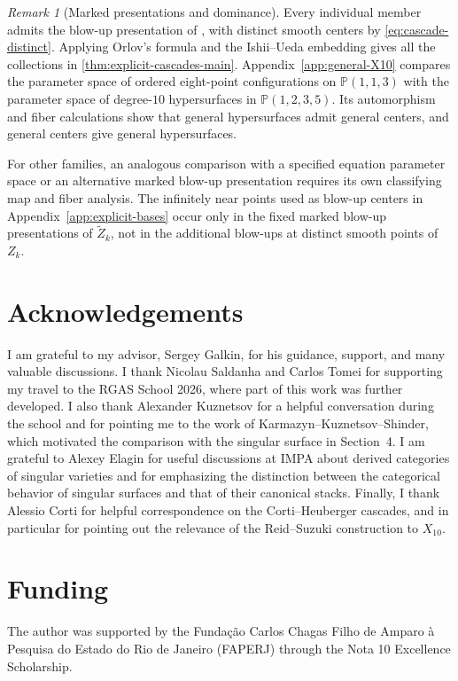 \documentclass[11pt]{article}
\theoremstyle{plain}
\theoremstyle{definition}
\theoremstyle{remark}
\newtheorem{remark}[remark]{Remark}
\newcommand{\Pp}{\mathbb P}
\begin{document}
\begin{remark}[Marked presentations and dominance]
\label{rem:presentations-versus-dominance}
Every individual member admits the blow-up presentation of
\cite[Corollary~8(1)--(6)]{Corti2016}, with distinct smooth centers by
\eqref{eq:cascade-distinct}. Applying Orlov's formula and the Ishii--Ueda
embedding gives all the collections in \cref{thm:explicit-cascades-main}.
Appendix~\ref{app:general-X10} compares the parameter space of ordered
eight-point configurations on \(\Pp(1,1,3)\) with the parameter space of
degree-\(10\) hypersurfaces in \(\Pp(1,2,3,5)\). Its automorphism and
fiber calculations show that general hypersurfaces admit general centers,
and general centers give general hypersurfaces.

For other families, an analogous comparison with a specified equation
parameter space or an alternative marked blow-up presentation requires its own
classifying map and fiber analysis.
The infinitely near points used as blow-up centers in
Appendix~\ref{app:explicit-bases} occur only in the fixed marked blow-up
presentations of \(\widetilde Z_k\), not in the additional blow-ups at
distinct smooth points of \(Z_k\).
\end{remark}



\section*{Acknowledgements}
I am grateful to my advisor, Sergey Galkin, for his guidance, support, and many valuable discussions. I thank Nicolau Saldanha and Carlos Tomei for supporting my travel to the RGAS School 2026, where part of this work was further developed. I also thank Alexander Kuznetsov for a helpful conversation during the school and for pointing me to the work of Karmazyn--Kuznetsov--Shinder, which motivated the comparison with the singular surface in Section~4. I am grateful to Alexey Elagin for useful discussions at IMPA about derived categories of singular varieties and for emphasizing the distinction between the categorical behavior of singular surfaces and that of their canonical stacks. Finally, I thank Alessio Corti for helpful correspondence on the Corti--Heuberger cascades, and in particular for pointing out the relevance of the Reid--Suzuki construction to \(X_{10}\).

\section*{Funding}
The author was supported by the Funda\c{c}\~ao Carlos Chagas Filho de Amparo \`a Pesquisa do Estado do Rio de Janeiro (FAPERJ) through the Nota 10 Excellence Scholarship.
\end{document}
